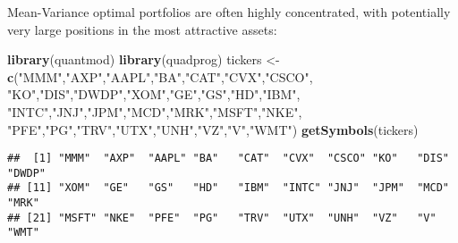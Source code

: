 \documentclass[]{book}
\newenvironment{Shaded}{\begin{snugshade}}{\end{snugshade}}
\newcommand{\KeywordTok}[1]{\textcolor[rgb]{0.13,0.29,0.53}{\textbf{#1}}}
\newcommand{\StringTok}[1]{\textcolor[rgb]{0.31,0.60,0.02}{#1}}
\newcommand{\NormalTok}[1]{#1}
\theoremstyle{definition}
\theoremstyle{definition}
\theoremstyle{definition}
\theoremstyle{remark}
\begin{document}
Mean-Variance optimal portfolios are often highly concentrated, with
potentially very large positions in the most attractive assets:

\begin{Shaded}
\begin{Highlighting}[]
\KeywordTok{library}\NormalTok{(quantmod)}
\KeywordTok{library}\NormalTok{(quadprog)}
\NormalTok{tickers <-}\StringTok{ }\KeywordTok{c}\NormalTok{(}\StringTok{"MMM"}\NormalTok{,}\StringTok{"AXP"}\NormalTok{,}\StringTok{"AAPL"}\NormalTok{,}\StringTok{"BA"}\NormalTok{,}\StringTok{"CAT"}\NormalTok{,}\StringTok{"CVX"}\NormalTok{,}\StringTok{"CSCO"}\NormalTok{,}
             \StringTok{"KO"}\NormalTok{,}\StringTok{"DIS"}\NormalTok{,}\StringTok{"DWDP"}\NormalTok{,}\StringTok{"XOM"}\NormalTok{,}\StringTok{"GE"}\NormalTok{,}\StringTok{"GS"}\NormalTok{,}\StringTok{"HD"}\NormalTok{,}\StringTok{"IBM"}\NormalTok{,}
             \StringTok{"INTC"}\NormalTok{,}\StringTok{"JNJ"}\NormalTok{,}\StringTok{"JPM"}\NormalTok{,}\StringTok{"MCD"}\NormalTok{,}\StringTok{"MRK"}\NormalTok{,}\StringTok{"MSFT"}\NormalTok{,}\StringTok{"NKE"}\NormalTok{,}
             \StringTok{"PFE"}\NormalTok{,}\StringTok{"PG"}\NormalTok{,}\StringTok{"TRV"}\NormalTok{,}\StringTok{"UTX"}\NormalTok{,}\StringTok{"UNH"}\NormalTok{,}\StringTok{"VZ"}\NormalTok{,}\StringTok{"V"}\NormalTok{,}\StringTok{"WMT"}\NormalTok{)}
\KeywordTok{getSymbols}\NormalTok{(tickers)}
\end{Highlighting}
\end{Shaded}

\begin{verbatim}
##  [1] "MMM"  "AXP"  "AAPL" "BA"   "CAT"  "CVX"  "CSCO" "KO"   "DIS"  "DWDP"
## [11] "XOM"  "GE"   "GS"   "HD"   "IBM"  "INTC" "JNJ"  "JPM"  "MCD"  "MRK" 
## [21] "MSFT" "NKE"  "PFE"  "PG"   "TRV"  "UTX"  "UNH"  "VZ"   "V"    "WMT"
\end{verbatim}
\end{document}
